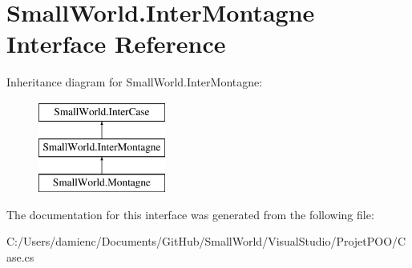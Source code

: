 \hypertarget{interface_small_world_1_1_inter_montagne}{\section{Small\-World.\-Inter\-Montagne Interface Reference}
\label{interface_small_world_1_1_inter_montagne}
}
Inheritance diagram for Small\-World.\-Inter\-Montagne\-:\begin{figure}[H]
\begin{center}
\leavevmode
\includegraphics[height=3.000000cm]{interface_small_world_1_1_inter_montagne}
\end{center}
\end{figure}


The documentation for this interface was generated from the following file\-:\begin{DoxyCompactItemize}
\item 
C\-:/\-Users/damienc/\-Documents/\-Git\-Hub/\-Small\-World/\-Visual\-Studio/\-Projet\-P\-O\-O/Case.\-cs\end{DoxyCompactItemize}
